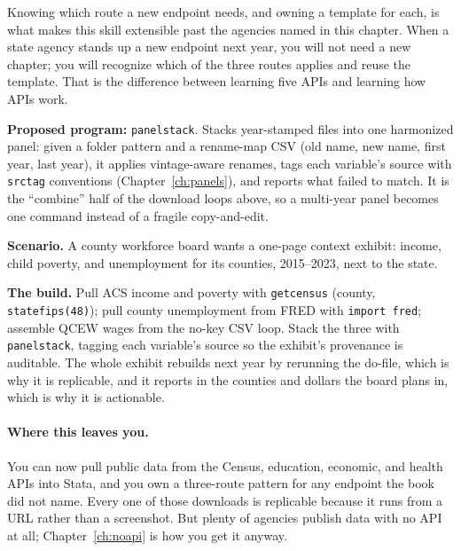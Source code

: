 \documentclass[
    a4paper,
    fontsize=10pt,
    twoside=true,
    numbers=noenddot,
]{kaobook}
\newcounter{appliedexample}
\newenvironment{appliedexample}[1][]{%
    \refstepcounter{appliedexample}%
    \begin{appliedexamplebox}[frametitle={Applied Example~\theappliedexample.~~#1}]%
}{%
    \end{appliedexamplebox}%
}
\begin{document}
Knowing which route a new endpoint needs, and owning a template for each, is what makes this skill extensible past the agencies named in this chapter. When a state agency stands up a new endpoint next year, you will not need a new chapter; you will recognize which of the three routes applies and reuse the template. That is the difference between learning five APIs and learning how APIs work.

\begin{kaobox}[frametitle=Ado-file Idea: \texttt{panelstack}]
\textbf{Proposed program:} \texttt{panelstack}. Stacks year-stamped files into one harmonized panel: given a folder pattern and a rename-map CSV (old name, new name, first year, last year), it applies vintage-aware renames, tags each variable's source with \texttt{srctag} conventions (Chapter~\ref{ch:panels}), and reports what failed to match. It is the \enquote{combine} half of the download loops above, so a multi-year panel becomes one command instead of a fragile copy-and-edit.
\end{kaobox}

\begin{appliedexample}[A Texas county panel from three APIs]
\textbf{Scenario.} A county workforce board wants a one-page context exhibit: income, child poverty, and unemployment for its counties, 2015--2023, next to the state.

\medskip
\textbf{The build.} Pull ACS income and poverty with \texttt{getcensus} (county, \texttt{statefips(48)}); pull county unemployment from FRED with \texttt{import fred}; assemble QCEW wages from the no-key CSV loop. Stack the three with \texttt{panelstack}, tagging each variable's source so the exhibit's provenance is auditable. The whole exhibit rebuilds next year by rerunning the do-file, which is why it is replicable, and it reports in the counties and dollars the board plans in, which is why it is actionable.
\end{appliedexample}

\paragraph{Where this leaves you.} You can now pull public data from the Census, education, economic, and health APIs into Stata, and you own a three-route pattern for any endpoint the book did not name. Every one of those downloads is replicable because it runs from a URL rather than a screenshot. But plenty of agencies publish data with no API at all; Chapter~\ref{ch:noapi} is how you get it anyway.
\end{document}
